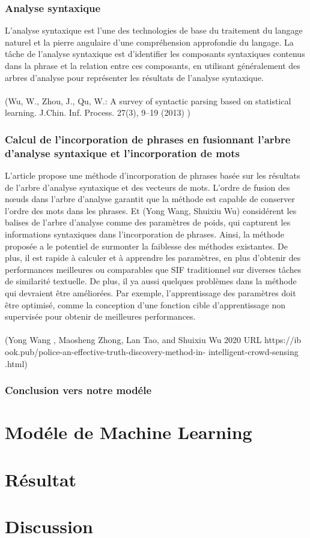\documentclass[12pt]{report}
\begin{document}
\subsection{Analyse syntaxique}

L'analyse syntaxique est l'une des technologies de base du traitement du
langage naturel et la pierre angulaire d'une compréhension approfondie du
langage. La tâche de l'analyse syntaxique est d'identifier les composants
syntaxiques contenus dans la phrase et la relation entre ces composants, en
utilisant généralement des arbres d'analyse pour représenter les résultats de
l'analyse syntaxique.
\\ \\(Wu, W., Zhou, J., Qu, W.: A survey of syntactic parsing based on
statistical learning. J.Chin. Inf. Process. 27(3), 9–19 (2013) )

\subsection{Calcul de l'incorporation de phrases en fusionnant l'arbre d'analyse syntaxique et l'incorporation de mots}

L'article propose une méthode d'incorporation de phrases basée sur les
résultats de l'arbre d'analyse syntaxique et des vecteurs de mots. L'ordre de
fusion des nœuds dans l'arbre d'analyse garantit que la méthode est capable
de conserver l'ordre des mots dans les phrases. Et (Yong Wang, Shuixiu
Wu) considérent les balises de l'arbre d'analyse comme des paramètres de
poids, qui capturent les informations syntaxiques dans l'incorporation de
phrases. Ainsi, la méthode proposée a le potentiel de surmonter la faiblesse
des méthodes existantes. De plus, il est rapide à calculer et à apprendre les
paramètres, en plus d'obtenir des performances meilleures ou comparables
que SIF traditionnel sur diverses tâches de similarité textuelle. De plus, il ya aussi quelques problèmes dans la méthode qui devraient être améliorées.
Par exemple, l'apprentissage des paramètres doit être optimisé, comme la
conception d'une fonction cible d'apprentissage non supervisée pour
obtenir de meilleures performances.
\\ \\(Yong Wang , Maosheng Zhong, Lan Tao, and Shuixiu Wu 2020 URL
https://ib\\ook.pub/police-an-effective-truth-discovery-method-in-
intelligent-crowd-sensing\\.html)

\subsection{Conclusion vers notre modéle}




\chapter{Modéle de Machine Learning}
\chapter{Résultat}
\chapter{Discussion}
\end{document}

